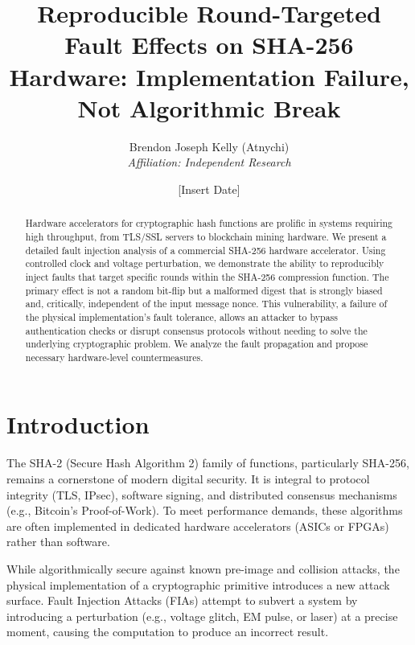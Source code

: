 \documentclass[11pt, a4paper]{article}
\title{Reproducible Round-Targeted Fault Effects on SHA-256 Hardware: Implementation Failure, Not Algorithmic Break}
\author{Brendon Joseph Kelly (Atnychi) \\ \textit{Affiliation: Independent Research}}
\date{[Insert Date]}
\begin{document}
\maketitle
\pagestyle{headings} %

\begin{abstract}
Hardware accelerators for cryptographic hash functions are prolific in systems requiring high throughput, from TLS/SSL servers to blockchain mining hardware. We present a detailed fault injection analysis of a commercial SHA-256 hardware accelerator. Using controlled clock and voltage perturbation, we demonstrate the ability to reproducibly inject faults that target specific rounds within the SHA-256 compression function. The primary effect is not a random bit-flip but a malformed digest that is strongly biased and, critically, independent of the input message nonce. This vulnerability, a failure of the physical implementation's fault tolerance, allows an attacker to bypass authentication checks or disrupt consensus protocols without needing to solve the underlying cryptographic problem. We analyze the fault propagation and propose necessary hardware-level countermeasures.
\end{abstract}

\section{Introduction}
The SHA-2 (Secure Hash Algorithm 2) family of functions, particularly SHA-256, remains a cornerstone of modern digital security. It is integral to protocol integrity (TLS, IPsec), software signing, and distributed consensus mechanisms (e.g., Bitcoin's Proof-of-Work). To meet performance demands, these algorithms are often implemented in dedicated hardware accelerators (ASICs or FPGAs) rather than software.

While algorithmically secure against known pre-image and collision attacks, the physical implementation of a cryptographic primitive introduces a new attack surface. Fault Injection Attacks (FIAs) attempt to subvert a system by introducing a perturbation (e.g., voltage glitch, EM pulse, or laser) at a precise moment, causing the computation to produce an incorrect result.
\end{document}

